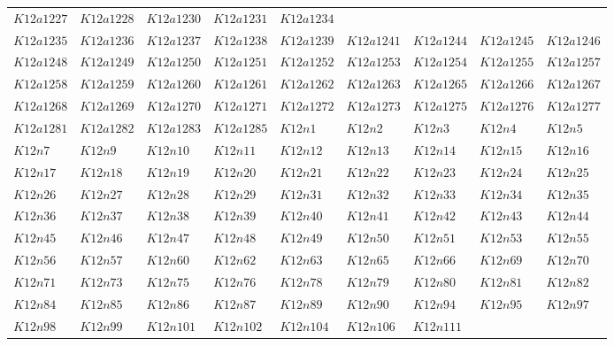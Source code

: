 \documentclass{amsart} %
\theoremstyle{thm}
\theoremstyle{definition}
\numberwithin{equation}{section}
\begin{document}
{\begin{longtable}{@{}lllllllll@{}}
  $K12a1227$ &  
  $K12a1228$ &  
  $K12a1230$ &  
  $K12a1231$ &  
  $K12a1234$ \\   
  $K12a1235$ &  
  $K12a1236$ &  
  $K12a1237$ &  
  $K12a1238$ &  
  $K12a1239$ &  
  $K12a1241$ &  
  $K12a1244$ &  
  $K12a1245$ &  
  $K12a1246$ \\   
  $K12a1248$ &  
  $K12a1249$ &  
  $K12a1250$ &  
  $K12a1251$ &  
  $K12a1252$ &  
  $K12a1253$ &  
  $K12a1254$ &  
  $K12a1255$ &  
  $K12a1257$ \\   
  $K12a1258$ &  
  $K12a1259$ &  
  $K12a1260$ &  
  $K12a1261$ &  
  $K12a1262$ &  
  $K12a1263$ &  
  $K12a1265$ &  
  $K12a1266$ &  
  $K12a1267$ \\   
  $K12a1268$ &  
  $K12a1269$ &  
  $K12a1270$ &  
  $K12a1271$ &  
  $K12a1272$ &  
  $K12a1273$ &  
  $K12a1275$ &  
  $K12a1276$ &  
  $K12a1277$ \\   
  $K12a1281$ &  
  $K12a1282$ &  
  $K12a1283$ &  
  $K12a1285$ &  
  $K12n1$ &  
  $K12n2$ &  
  $K12n3$ &  
  $K12n4$ &  
  $K12n5$ \\   
  $K12n7$ &  
  $K12n9$ &  
  $K12n10$ &  
  $K12n11$ &  
  $K12n12$ &  
  $K12n13$ &  
  $K12n14$ &  
  $K12n15$ &  
  $K12n16$ \\   
  $K12n17$ &  
  $K12n18$ &  
  $K12n19$ &  
  $K12n20$ &  
  $K12n21$ &  
  $K12n22$ &  
  $K12n23$ &  
  $K12n24$ &  
  $K12n25$ \\   
  $K12n26$ &  
  $K12n27$ &  
  $K12n28$ &  
  $K12n29$ &  
  $K12n31$ &  
  $K12n32$ &  
  $K12n33$ &  
  $K12n34$ &  
  $K12n35$ \\   
  $K12n36$ &  
  $K12n37$ &  
  $K12n38$ &  
  $K12n39$ &  
  $K12n40$ &  
  $K12n41$ &  
  $K12n42$ &  
  $K12n43$ &  
  $K12n44$ \\   
  $K12n45$ &  
  $K12n46$ &  
  $K12n47$ &  
  $K12n48$ &  
  $K12n49$ &  
  $K12n50$ &  
  $K12n51$ &  
  $K12n53$ &  
  $K12n55$ \\   
  $K12n56$ &  
  $K12n57$ &  
  $K12n60$ &  
  $K12n62$ &  
  $K12n63$ &  
  $K12n65$ &  
  $K12n66$ &  
  $K12n69$ &  
  $K12n70$ \\   
  $K12n71$ &  
  $K12n73$ &  
  $K12n75$ &  
  $K12n76$ &  
  $K12n78$ &  
  $K12n79$ &  
  $K12n80$ &  
  $K12n81$ &  
  $K12n82$ \\   
  $K12n84$ &  
  $K12n85$ &  
  $K12n86$ &  
  $K12n87$ &  
  $K12n89$ &  
  $K12n90$ &  
  $K12n94$ &  
  $K12n95$ &  
  $K12n97$ \\   
  $K12n98$ &  
  $K12n99$ &  
  $K12n101$ &  
  $K12n102$ &  
  $K12n104$ &  
  $K12n106$ &  
  $K12n111$ &  

\end{longtable}}
\end{document}
